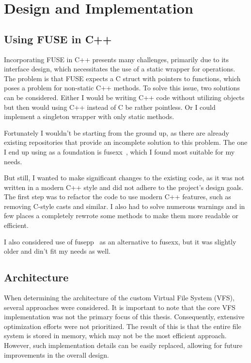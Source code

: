 \chapter{Design and Implementation}
\label{chap:design-and-architecture}

\section{Using FUSE in C++}\label{sec:fuse-in-cpp}

Incorporating FUSE in C++ presents many challenges, primarily due to its interface design, which necessitates the use of a static wrapper for operations.
The problem is that FUSE expects a C struct with pointers to functions, which poses a problem for non-static C++ methods.
To solve this issue, two solutions can be considered.
Either I would be writing C++ code without utilizing objects but then would using C++ instead of C be rather pointless.
Or I could implement a singleton wrapper with only static methods.

Fortunately I wouldn't be starting from the ground up, as there are already existing repositories that provide an incomplete solution to this problem.
The one I end up using as a foundation is fusexx~\cite{fusexx}, which I found most suitable for my needs.

But still, I wanted to make significant changes to the existing code, as it was not written in a modern C++ style and did not adhere to the project's design goals.
The first step was to refactor the code to use modern C++ features, such as removing C-style casts and similar.
I also had to solve numerous warnings and in few places a completely rewrote some methods to make them more readable or efficient.

I also considered use of fusepp~\cite{fusepp} as an alternative to fusexx, but it was slightly older and din't fit my needs as well.

\section{Architecture}\label{sec:architecture}

When determining the architecture of the custom Virtual File System (VFS), several approaches were considered.
It is important to note that the core VFS implementation was not the primary focus of this thesis.
Consequently, extensive optimization efforts were not prioritized.
The result of this is that the entire file system is stored in memory, which may not be the most efficient approach.
However, such implementation details can be easily replaced, allowing for future improvements in the overall design.

